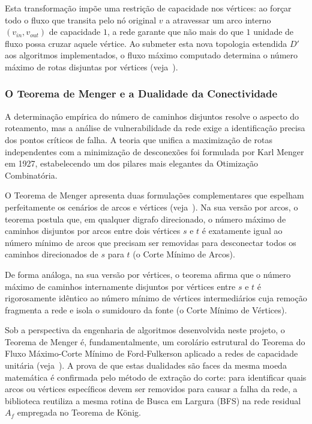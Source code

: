 \documentclass[12pt,a4paper]{article}
\begin{document}
\begin{enumerate}
Esta transformação impõe uma restrição de capacidade nos vértices: ao forçar todo o fluxo que transita pelo nó original $v$ a atravessar um arco interno $(v_{in}, v_{out})$ de capacidade $1$, a rede garante que não mais do que $1$ unidade de fluxo possa cruzar aquele vértice. Ao submeter esta nova topologia estendida $D'$ aos algoritmos implementados, o fluxo máximo computado determina o número máximo de rotas disjuntas por vértices (veja~\cite{korte2018combinatorial}).

\subsubsection{O Teorema de Menger e a Dualidade da Conectividade}

A determinação empírica do número de caminhos disjuntos resolve o aspecto do roteamento, mas a análise de vulnerabilidade da rede exige a identificação precisa dos pontos críticos de falha. A teoria que unifica a maximização de rotas independentes com a minimização de desconexões foi formulada por Karl Menger em 1927, estabelecendo um dos pilares mais elegantes da Otimização Combinatória.

O Teorema de Menger apresenta duas formulações complementares que espelham perfeitamente os cenários de arcos e vértices (veja~\cite{cook1998combinatorial}). Na sua versão por arcos, o teorema postula que, em qualquer digrafo direcionado, o número máximo de caminhos disjuntos por arcos entre dois vértices $s$ e $t$ é exatamente igual ao número mínimo de arcos que precisam ser removidas para desconectar todos os caminhos direcionados de $s$ para $t$ (o Corte Mínimo de Arcos).

De forma análoga, na sua versão por vértices, o teorema afirma que o número máximo de caminhos internamente disjuntos por vértices entre $s$ e $t$ é rigorosamente idêntico ao número mínimo de vértices intermediários cuja remoção fragmenta a rede e isola o sumidouro da fonte (o Corte Mínimo de Vértices).

Sob a perspectiva da engenharia de algoritmos desenvolvida neste projeto, o Teorema de Menger é, fundamentalmente, um corolário estrutural do Teorema do Fluxo Máximo-Corte Mínimo de Ford-Fulkerson aplicado a redes de capacidade unitária (veja~\cite{ahuja1993network}). A prova de que estas dualidades são faces da mesma moeda matemática é confirmada pelo método de extração do corte: para identificar quais arcos ou vértices específicos devem ser removidos para causar a falha da rede, a biblioteca reutiliza a mesma rotina de Busca em Largura (BFS) na rede residual $A_f$ empregada no Teorema de König.


\end{enumerate}
\end{document}
